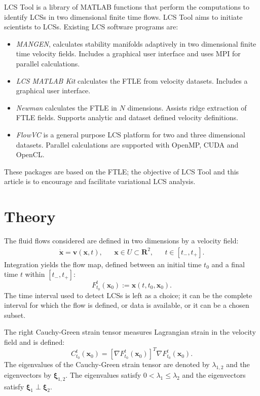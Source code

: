 \documentclass{article}
\newcommand{\reals}{\mathbf R}
\begin{document}
LCS Tool is a library of MATLAB functions that perform the computations to identify LCSs in two dimensional finite time flows. LCS Tool aims to initiate scientists to LCSs. Existing LCS software programs are:
\begin{itemize}
\item \emph{MANGEN}\parencite{lekien03:_time}, calculates stability manifolds adaptively in two dimensional finite time velocity fields. Includes a graphical user interface and uses MPI for parallel calculations.
\item \emph{LCS MATLAB Kit}\parencite{dabiri09:_lmk} calculates the FTLE from velocity datasets. Includes a graphical user interface.
\item \emph{Newman}\parencite{toit10:_trans} calculates the FTLE in $N$ dimensions. Assists ridge extraction of FTLE fields. Supports analytic and dataset defined velocity definitions.
\item \emph{FlowVC}\parencite{shadden10:_flowvc} is a general purpose LCS platform for two and three dimensional datasets. Parallel calculations are supported with Open\-MP, CUDA and OpenCL.
\end{itemize}
These packages are based on the FTLE; the objective of LCS Tool and this article is to encourage and facilitate variational LCS analysis.

\section{Theory}

The fluid flows considered are defined in two dimensions by a velocity field:
\begin{align*}
\dot{\boldsymbol x} = \boldsymbol v(\boldsymbol x,t), && \boldsymbol x \in U \subset \reals^2, && t \in [t_-,t_+].
\end{align*}
Integration yields the flow map, defined between an initial time $t_0$ and a final time $t$ within $[t_-,t_+]$:
\[
F_{t_0}^t(\boldsymbol x_0) := \boldsymbol x(t,t_0,\boldsymbol x_0).
\]
The time interval used to detect LCSs is left as a choice; it can be the complete interval for which the flow is defined, or data is available, or it can be a chosen subset.

The right Cauchy-Green strain tensor measures Lagrangian strain in the velocity field and is defined:
\[
C_{t_0}^t(\boldsymbol x_0) = \left[\nabla F_{t_0}^t(\boldsymbol x_0)\right]^T \nabla F_{t_0}^t(\boldsymbol x_0).
\]
The eigenvalues of the Cauchy-Green strain tensor are denoted by $\lambda_{1,2}$ and the eigenvectors by $\boldsymbol \xi_{1,2}$. The eigenvalues satisfy $0 < \lambda_1 \leq \lambda_2$ and the eigenvectors satisfy $\boldsymbol \xi_1 \perp \boldsymbol \xi_2$.
\end{document}
